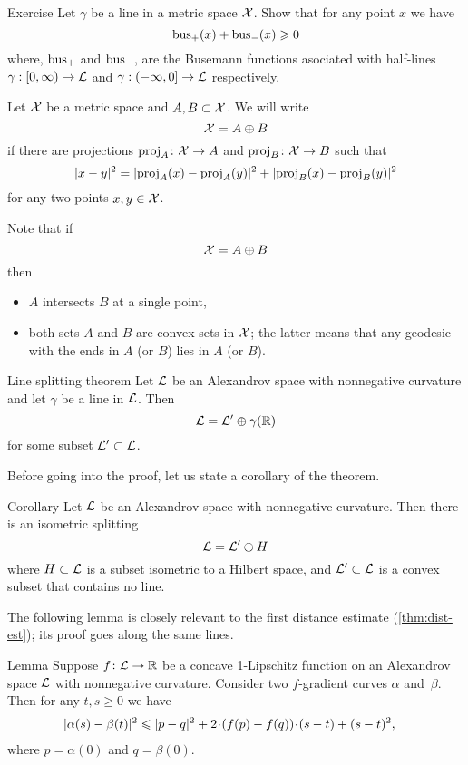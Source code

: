 \begin{thm}{Exercise}\label{ex:bus+bus}
Let $\gamma$ be a line in a metric space $\mathcal{X}$.
Show that for any point $x$ we have
\[\operatorname{\rm bus}\nolimits_+(x)+\operatorname{\rm bus}\nolimits_-(x)\geqslant 0\]
where, $\operatorname{\rm bus}\nolimits_+$ and $\operatorname{\rm bus}\nolimits_-$, are the Busemann functions asociated with half-lines $\gamma:[0,\infty)\to \mathcal{L}$ and $\gamma:(-\infty,0]\to \mathcal{L}$ respectively.
\end{thm}


Let $\mathcal{X}$ be a metric space and $A,B\subset \mathcal{X}$.
We will write 
\[\mathcal{X}=A\oplus B\]
if there are projections $\operatorname{\rm proj}\nolimits_A\colon\mathcal{X}\to A$ 
and 
$\operatorname{\rm proj}\nolimits_B\colon\mathcal{X}\to B$
such that 
\[\dist[2]{x}{y}{}=\dist[2]{\proj_A(x)}{\proj_A(y)}{}+\dist[2]{\proj_B(x)}{\proj_B(y)}{}\]
for any two points $x,y\in \mathcal{X}$.

Note that if 
\[\mathcal{X}=A\oplus B\]
then 
\begin{itemize}
\item $A$ intersects $B$ at a single point,
\item both sets $A$ and $B$ are convex sets in $\mathcal{X}$;
the latter means that any geodesic with the ends in $A$ (or $B$) lies in $A$ (or $B$). 
\end{itemize}

\begin{thm}{Line splitting theorem}\label{thm:splitting}
Let $\mathcal{L}$  be an Alexandrov space with nonnegative curvature
and let $\gamma$ be a line in $\mathcal{L}$. 
Then 
\[\mathcal{L}=\mathcal{L}'\oplus \gamma(\mathbb{R})\]
for some subset $\mathcal{L}'\subset \mathcal{L}$.
\end{thm}

Before going into the proof, let us state a corollary of the theorem.

\begin{thm}{Corollary}\label{cor:splitting}
Let $\mathcal{L}$ be an Alexandrov space with nonnegative curvature. 
Then there is an isometric splitting
\[
\mathcal{L}=\mathcal{L}'\oplus H
\]
where $H\subset \mathcal{L}$ is a subset isometric to a Hilbert space, and $\mathcal{L}'\subset \mathcal{L}$ is a convex subset that contains no line. 
\end{thm}

The following lemma is closely relevant to the first distance estimate (\ref{thm:dist-est}); its proof goes along the same lines.

\begin{thm}{Lemma}\label{lem:dist-estimate}
Suppose $f\colon\mathcal{L}\to\mathbb{R}$ be a concave 1-Lipschitz function on an Alexandrov space $\mathcal{L}$ with nonnegative curvature.
Consider two $f$-gradient curves $\alpha$ and~$\beta$.
Then for any $t, s\ge 0$ we have
\begin{align*}
&\dist[2]{\alpha(s)}{\beta(t)}{}
\le 
\dist[2]{p}{q}{}+
2\cdot(f(p)-f(q))\cdot(s-t)+ (s-t)^2,
\end{align*}
where $p=\alpha(0)$ and $q=\beta(0)$.
\end{thm}

